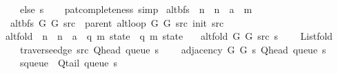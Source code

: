 \begin{isabellebody}
\ \ \ \ else\ s{\isacharparenright}{\kern0pt}{\isachardoublequoteclose}\isanewline
%
\isadelimproof
\ \ %
\endisadelimproof
%
\isatagproof
{}\isamarkupfalse%
\ pat{\isacharunderscore}{\kern0pt}completeness\ simp%
\endisatagproof
{\isafoldproof}%
%
\isadelimproof
\isanewline
%
\endisadelimproof
\isanewline
{}\isamarkupfalse%
\ alt{\isacharunderscore}{\kern0pt}bfs\ {\isacharcolon}{\kern0pt}{\isacharcolon}{\kern0pt}\ {\isachardoublequoteopen}{\isacharprime}{\kern0pt}n\ {\isasymRightarrow}\ {\isacharprime}{\kern0pt}n\ {\isasymRightarrow}\ {\isacharprime}{\kern0pt}a\ {\isasymRightarrow}\ {\isacharprime}{\kern0pt}m{\isachardoublequoteclose}\ \isanewline
\ \ {\isachardoublequoteopen}alt{\isacharunderscore}{\kern0pt}bfs\ G{}\ G{}\ src\ {\isasymequiv}\ parent\ {\isacharparenleft}{\kern0pt}alt{\isacharunderscore}{\kern0pt}loop\ G{}\ G{}\ src\ {\isacharparenleft}{\kern0pt}init\ src{\isacharparenright}{\kern0pt}{\isacharparenright}{\kern0pt}{\isachardoublequoteclose}\isanewline
\isanewline
{}\isamarkupfalse%
\ alt{\isacharunderscore}{\kern0pt}fold\ {\isacharcolon}{\kern0pt}{\isacharcolon}{\kern0pt}\ {\isachardoublequoteopen}{\isacharprime}{\kern0pt}n\ {\isasymRightarrow}\ {\isacharprime}{\kern0pt}n\ {\isasymRightarrow}\ {\isacharprime}{\kern0pt}a\ {\isasymRightarrow}\ {\isacharparenleft}{\kern0pt}{\isacharprime}{\kern0pt}q{\isacharcomma}{\kern0pt}\ {\isacharprime}{\kern0pt}m{\isacharparenright}{\kern0pt}\ state\ {\isasymRightarrow}\ {\isacharparenleft}{\kern0pt}{\isacharprime}{\kern0pt}q{\isacharcomma}{\kern0pt}\ {\isacharprime}{\kern0pt}m{\isacharparenright}{\kern0pt}\ state{\isachardoublequoteclose}\ \isanewline
\ \ {\isachardoublequoteopen}alt{\isacharunderscore}{\kern0pt}fold\ G{}\ G{}\ src\ s\ {\isasymequiv}\isanewline
\ \ \ List{\isachardot}{\kern0pt}fold\isanewline
\ \ \ \ {\isacharparenleft}{\kern0pt}traverse{\isacharunderscore}{\kern0pt}edge\ src\ {\isacharparenleft}{\kern0pt}Q{\isacharunderscore}{\kern0pt}head\ {\isacharparenleft}{\kern0pt}queue\ s{\isacharparenright}{\kern0pt}{\isacharparenright}{\kern0pt}{\isacharparenright}{\kern0pt}\isanewline
\ \ \ \ {\isacharparenleft}{\kern0pt}adjacency\ G{}\ G{}\ s\ {\isacharparenleft}{\kern0pt}Q{\isacharunderscore}{\kern0pt}head\ {\isacharparenleft}{\kern0pt}queue\ s{\isacharparenright}{\kern0pt}{\isacharparenright}{\kern0pt}{\isacharparenright}{\kern0pt}\isanewline
\ \ \ \ {\isacharparenleft}{\kern0pt}s{\isasymlparr}queue\ {\isacharcolon}{\kern0pt}{\isacharequal}{\kern0pt}\ Q{\isacharunderscore}{\kern0pt}tail\ {\isacharparenleft}{\kern0pt}queue\ s{\isacharparenright}{\kern0pt}{\isasymrparr}{\isacharparenright}{\kern0pt}{\isachardoublequoteclose}\isanewline

\end{isabellebody}
